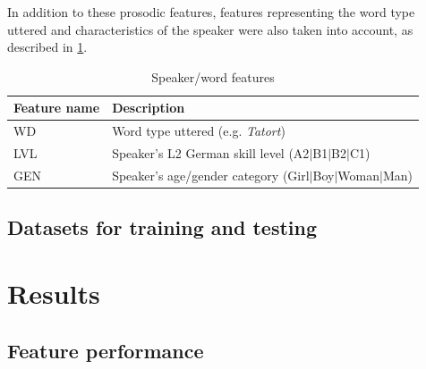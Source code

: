\documentclass[a4paper]{article}
\begin{document}
		
		 In addition to these prosodic features, features representing the word type uttered and characteristics of the speaker were also taken into account, as described in \cref{tab:spkrfeatures}.
		
		\begin{table}
			\centering
			\caption{Speaker/word features}
			\begin{tabularx}{\columnwidth}{lX}
			\toprule
			Feature name & Description \\
			\midrule
			WD %
				& Word type uttered (e.g. \textit{Tatort}) \\
			LVL %
				& Speaker's L2 German skill level \newline (A2$|$B1$|$B2$|$C1)\\
			GEN %
				& Speaker's age/gender category \newline (Girl$|$Boy$|$Woman$|$Man)\\
			\bottomrule
			\end{tabularx}
			\label{tab:spkrfeatures}		
		\end{table}
	    
	    
	    \subsection{Datasets for training and testing}
	    \label{sec:method:datasets}



	\section{Results}
	\label{sec:results}
		\subsection{Feature performance}
\end{document}
